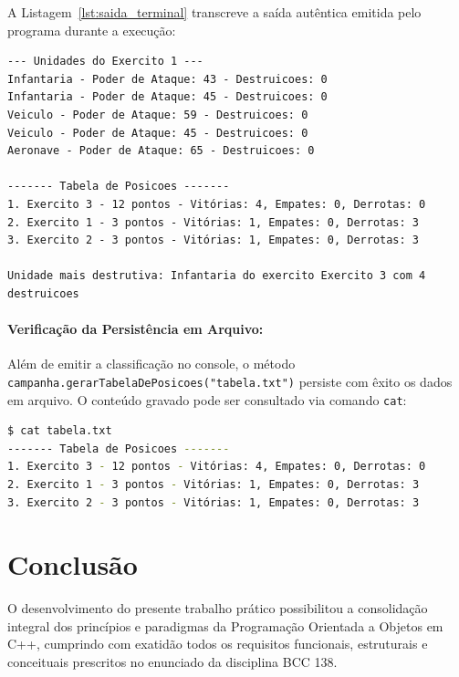 \documentclass[12pt,a4paper]{article}
\begin{document}
A Listagem~\ref{lst:saida_terminal} transcreve a saída autêntica emitida pelo programa durante a execução:

\begin{lstlisting}[language={}, numbers=none, caption={Saída real capturada durante a execução do programa.}, label={lst:saida_terminal}]
--- Unidades do Exercito 1 ---
Infantaria - Poder de Ataque: 43 - Destruicoes: 0
Infantaria - Poder de Ataque: 45 - Destruicoes: 0
Veiculo - Poder de Ataque: 59 - Destruicoes: 0
Veiculo - Poder de Ataque: 45 - Destruicoes: 0
Aeronave - Poder de Ataque: 65 - Destruicoes: 0

------- Tabela de Posicoes -------
1. Exercito 3 - 12 pontos - Vitórias: 4, Empates: 0, Derrotas: 0
2. Exercito 1 - 3 pontos - Vitórias: 1, Empates: 0, Derrotas: 3
3. Exercito 2 - 3 pontos - Vitórias: 1, Empates: 0, Derrotas: 3

Unidade mais destrutiva: Infantaria do exercito Exercito 3 com 4 destruicoes
\end{lstlisting}

\paragraph{Verificação da Persistência em Arquivo:}
Além de emitir a classificação no console, o método \texttt{campanha.gerarTabelaDePosicoes("tabela.txt")} persiste com êxito os dados em arquivo. O conteúdo gravado pode ser consultado via comando \texttt{cat}:
\begin{lstlisting}[language=bash, numbers=none, caption={Verificação do arquivo texto de classificação gerado.}]
$ cat tabela.txt
------- Tabela de Posicoes -------
1. Exercito 3 - 12 pontos - Vitórias: 4, Empates: 0, Derrotas: 0
2. Exercito 1 - 3 pontos - Vitórias: 1, Empates: 0, Derrotas: 3
3. Exercito 2 - 3 pontos - Vitórias: 1, Empates: 0, Derrotas: 3
\end{lstlisting}

\section{Conclusão}
\label{sec:conclusao}

O desenvolvimento do presente trabalho prático possibilitou a consolidação integral dos princípios e paradigmas da Programação Orientada a Objetos em C++, cumprindo com exatidão todos os requisitos funcionais, estruturais e conceituais prescritos no enunciado da disciplina BCC 138.
\end{document}
